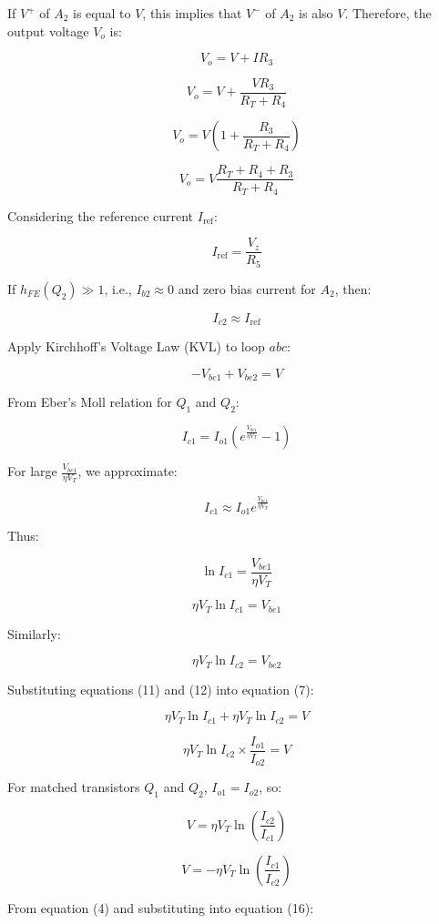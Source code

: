 \documentclass[a4paper,9pt,twoside,openany,twocolumn]{memoir}
\begin{document}
If \( V^+ \) of \( A_2 \) is equal to \( V \), this implies that \( V^- \) of \( A_2 \) is also \( V \). Therefore, the output voltage \( V_o \) is:

\[
V_o = V + I R_3 \tag{1}
\]

\[
V_o = V + \frac{V R_3}{R_T + R_4} \tag{2}
\]

\[
V_o = V \left( 1 + \frac{R_3}{R_T + R_4} \right) \tag{3}
\]

\[
V_o = V \frac{R_T + R_4 + R_3}{R_T + R_4} \tag{4}
\]

Considering the reference current \( I_{\text{ref}} \):

\[
I_{\text{ref}} = \frac{V_z}{R_5} \tag{5}
\]

If \( h_{FE}(Q_2) \gg 1 \), i.e., \( I_{b2} \approx 0 \) and zero bias current for \( A_2 \), then:

\[
I_{c2} \approx I_{\text{ref}} \tag{6}
\]

Apply Kirchhoff’s Voltage Law (KVL) to loop \( abc \):

\[
-V_{be1} + V_{be2} = V \tag{7}
\]

From Eber’s Moll relation for \( Q_1 \) and \( Q_2 \):

\[
I_{c1} = I_{o1} \left( e^{\frac{V_{be1}}{\eta V_T}} - 1 \right) \tag{8}
\]

For large \( \frac{V_{be1}}{\eta V_T} \), we approximate:

\[
I_{c1} \approx I_{o1} e^{\frac{V_{be1}}{\eta V_T}} \tag{9}
\]

Thus:

\[
\ln I_{c1} = \frac{V_{be1}}{\eta V_T} \tag{10}
\]

\[
\eta V_T \ln I_{c1} = V_{be1} \tag{11}
\]

Similarly:

\[
\eta V_T \ln I_{c2} = V_{be2} \tag{12}
\]

Substituting equations (11) and (12) into equation (7):

\[
\eta V_T \ln I_{c1} + \eta V_T \ln I_{c2} = V \tag{13}
\]

\[
\eta V_T \ln I_{c2} \times \frac{I_{o1}}{I_{o2}} = V \tag{14}
\]

For matched transistors \( Q_1 \) and \( Q_2 \), \( I_{o1} = I_{o2} \), so:

\[
V = \eta V_T \ln \left( \frac{I_{c2}}{I_{c1}} \right) \tag{15}
\]

\[
V = -\eta V_T \ln \left( \frac{I_{c1}}{I_{c2}} \right) \tag{16}
\]

From equation (4) and substituting into equation (16):
\end{document}
